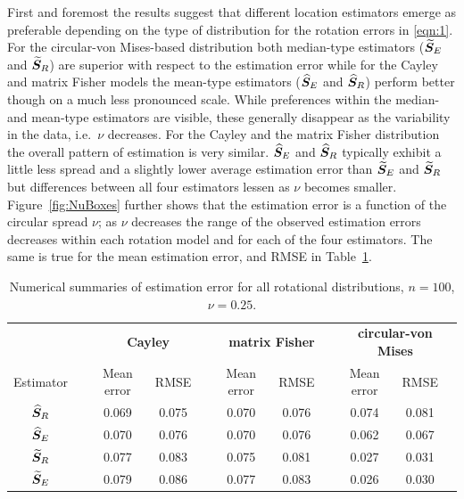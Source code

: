 First and foremost the results suggest that different location estimators emerge as preferable depending on the type of distribution for the rotation errors in \eqref{eqn:1}.  For the circular-von Mises-based distribution both median-type estimators (${\widetilde{\bm S}_E}$ and ${\widetilde{\bm S}_R}$) are superior with respect to the estimation error while for the Cayley and matrix Fisher models the mean-type estimators (${\widehat{\bm S}_E}$ and ${\widehat{\bm S}_R}$) perform better though on a much less pronounced scale. While preferences within the median- and mean-type estimators are visible, these generally disappear as the variability in the data, i.e.~$\nu$ decreases.    
For the Cayley and the matrix Fisher distribution the overall pattern of estimation is very similar. ${\widehat{\bm S}_E}$ and ${\widehat{\bm S}_R}$ typically exhibit a little less spread and a slightly lower average estimation error than ${\widetilde{\bm S}_E}$ and ${\widetilde{\bm S}_R}$ but differences between all four estimators lessen as $\nu$ becomes smaller. Figure~\ref{fig:NuBoxes} further shows that the estimation error is a function of the circular spread $\nu$; as $\nu$ decreases the range of the observed estimation errors decreases within each rotation model and for each of the four estimators. The same is true for the mean estimation error, and RMSE in Table~\ref{tab:alldN100Nu25}.  

\begin{center}
\begin{table}[h!]
\caption{Numerical summaries of estimation error for all rotational distributions, $n=100$,  $\nu=0.25$.  \label{tab:alldN100Nu25}}
\begin{tabular}{ccccccccccc}
  \hline
		& &\multicolumn{3}{c}{\textbf{Cayley}} & \multicolumn{3}{c}{\textbf{matrix Fisher}}  & \multicolumn{3}{c}{\textbf{circular-von Mises}}\\ 
Estimator 	& &  Mean error & RMSE& &  Mean error & RMSE& &   Mean error & RMSE \\  \hline \hline %
 		  ${\widehat{\bm S}_R}$ & &  0.069 & 0.075 & &  0.070 & 0.076&  & 0.074 & 0.081 \\ 
 		 ${\widehat{\bm S}_E}$ &  & 0.070 & 0.076 & &  0.070 & 0.076&  &  0.062 & 0.067\\ 
		 ${\widetilde{\bm S}_R}$ &  & 0.077 & 0.083 & &  0.075 & 0.081&  & 0.027 & 0.031\\ 
 		  ${\widetilde{\bm S}_E}$ &  & 0.079 & 0.086 & &  0.077 & 0.083 & & 0.026 & 0.030\\ \hline
\end{tabular}
\end{table}
\end{center}


